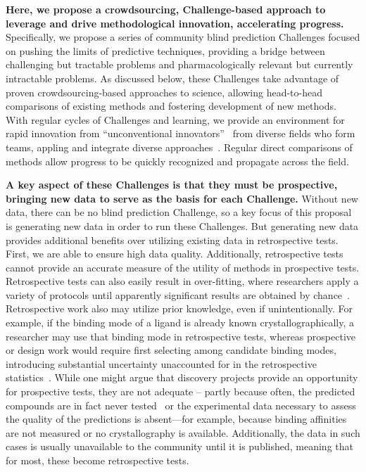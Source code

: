 \documentclass[11pt]{article}
\begin{document}
{\bf Here, we propose a crowdsourcing, Challenge-based approach to leverage and drive methodological innovation, accelerating progress.} 
Specifically, we propose a series of community blind prediction Challenges focused on pushing the limits of predictive techniques, providing a bridge between challenging but tractable problems and pharmacologically relevant but currently intractable problems.
As discussed below, these Challenges take advantage of proven crowdsourcing-based approaches to science, allowing head-to-head comparisons of existing methods and fostering development of new methods.
With regular cycles of Challenges and learning, we provide an environment for rapid innovation from ``unconventional innovators''~\cite{Kay:2011:R&DManage} from diverse fields who form teams, appling and integrate diverse approaches~\cite{Saez-Rodriguez:2016:NatRevGenet}.
Regular direct comparisons of methods allow progress to be quickly recognized and propagate across the field.

{\bf A key aspect of these Challenges is that they must be prospective, bringing new data to serve as the basis for each Challenge.}
Without new data, there can be no blind prediction Challenge, so a key focus of this proposal is generating new data in order to run these Challenges.
But generating new data provides additional benefits over utilizing existing data in retrospective tests.
First, we are able to ensure high data quality.
Additionally, retrospective tests cannot provide an accurate measure of the utility of methods in prospective tests. 
Retrospective tests can also easily result in over-fitting, where researchers apply a variety of protocols until apparently significant results are obtained by chance~\cite{Nuzzo:2015:Nature}.
Retrospective work also may utilize prior knowledge, even if unintentionally.  
For example, if the binding mode of a ligand is already known crystallographically, a researcher may use that binding mode in retrospective tests, whereas prospective or design work would require first selecting among candidate binding modes, introducing substantial uncertainty unaccounted for in the retrospective statistics~\cite{mobley_predicting_2007, boyce_predicting_2009, mobley_perspective_2012}.
While one might argue that discovery projects provide an opportunity for prospective tests, they are not adequate -- partly because often, the predicted compounds are in fact never tested~\cite{christ_binding_2016} or the experimental data necessary to assess the quality of the predictions is absent---for example, because binding affinities are not measured or no crystallography is available. 
Additionally, the data in such cases is usually unavailable to the community until it is published, meaning that for most, these become retrospective tests.
\end{document}
